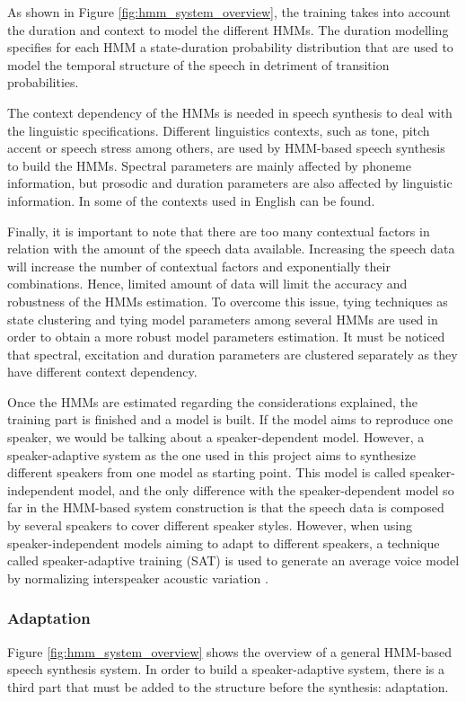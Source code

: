 As shown in Figure \ref{fig:hmm_system_overview}, the training takes into account the duration and context to model the different HMMs.
%
The duration modelling specifies for each HMM a state-duration probability distribution that are used to model the temporal structure of the speech in detriment of transition probabilities.

The context dependency of the HMMs is needed in speech synthesis to deal with the linguistic specifications.
%
Different linguistics contexts, such as tone, pitch accent or speech stress among others, are used by HMM-based speech synthesis to build the HMMs.
%
Spectral parameters are mainly affected by phoneme information, but prosodic and duration parameters are also affected by linguistic information. In \cite{tokuda13} some of the contexts used in English can be found.

Finally, it is important to note that there are too many contextual factors in relation with the amount of the speech data available. 
%
Increasing the speech data will increase the number of contextual factors and exponentially their combinations.
%
Hence, limited amount of data will limit the accuracy and robustness of the HMMs estimation.
%
To overcome this issue, tying techniques as state clustering and tying model parameters among several HMMs are used in order to obtain a more robust model parameters estimation.
%
It must be noticed that spectral, excitation and duration parameters are clustered separately as they have different context dependency.

Once the HMMs are estimated regarding the considerations explained, the training part is finished and a model is built.
%
If the model aims to reproduce one speaker, we would be talking about a speaker-dependent model.
%
However, a speaker-adaptive system as the one used in this project aims to synthesize different speakers from one model as starting point.
%
This model is called speaker-independent model, and the only difference with the speaker-dependent model so far in the HMM-based system construction is that the speech data is composed by several speakers to cover different speaker styles.
%
However, when using speaker-independent models aiming to adapt to different speakers, a technique called speaker-adaptive training (SAT) is used to generate an average voice model by normalizing interspeaker acoustic variation \cite{anastasakos1996, yamagishi2003training}.

\subsubsection{Adaptation}
\label{hmm_synthesis_adaptation}
Figure \ref{fig:hmm_system_overview} shows the overview of a general HMM-based speech synthesis system.
%
In order to build a speaker-adaptive system, there is a third part that must be added to the structure before the synthesis: adaptation.

